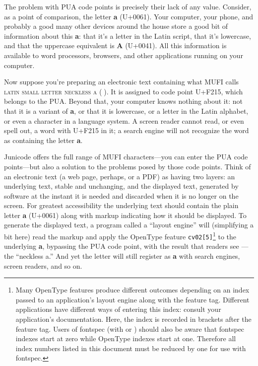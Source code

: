 \documentclass[12pt,letterpaper,openany]{book}
\newcommand\textLetterExample[1]{\textrm{\textbf{\color{BrickRed}#1}}}
\newcommand\textUName[1]{\textsc{#1}}
\newcommand\textSourceText[1]{{\color{GGOrange}\texttt{#1}}}
\newcommand{\cvd}[3][0]{{\addfontfeature{CharacterVariant=#2:#1}#3}}
\begin{document}
The problem with PUA code points is precisely their lack of any value. Consider, as a point of comparison, the letter
\textLetterExample{a} (U+0061). Your computer, your phone, and probably a good many other devices around the house
store a good bit of information about this \textLetterExample{a}: that it’s a letter in the Latin script, that
it’s lowercase, and that the uppercase equivalent is \textLetterExample{A} (U+0041). All this information is
available to word processors, browsers, and other applications running on your computer.

Now suppose you're preparing an electronic text containing what MUFI calls \textUName{latin small letter neckless
a} (\textLetterExample{}). It is assigned to code point U+F215, which belongs to the PUA. Beyond that, your
computer knows nothing about it: not that it is a variant of \textLetterExample{a}, or that it is lowercase, or a letter in the Latin
alphabet, or even a character in a language system. A screen reader cannot read, or even spell out, a word with U+F215
in it; a search engine will not recognize the word as containing the letter \textLetterExample{a}.

Junicode offers the full range of MUFI characters---you can enter the PUA code points---but also a solution to the
problems posed by those code points. Think of an electronic text (a web page, perhaps, or a PDF) as having two layers:
an underlying text, stable and unchanging, and the displayed text, generated by software at the instant it is needed
and discarded when it is no longer on the screen. For greatest accessibility the underlying text should contain the
plain letter \textLetterExample{a} (U+0061) along with markup indicating how it should be displayed. To generate
the displayed text, a program called a ``layout engine'' will (simplifying a bit here) read the markup and apply the
OpenType feature \textSourceText{cv02[5]}\footnote{Many OpenType features produce different outcomes depending on
an index passed to an application’s layout engine along with the feature tag. Different applications have different
ways of entering this index: consult your application’s documentation. Here, the index is recorded in brackets after
the feature tag. Users of fontspec (with {\XeLaTeX} or {\LuaTeX}) should also be aware that fontspec indexes start at zero
while OpenType indexes start at one. Therefore all index numbers listed in this document must be reduced by one for
use with fontspec.\par } to the underlying \textLetterExample{a}, bypassing the PUA code point, with the result that
readers see \textLetterExample{\cvd[4]{2}{a}}{}---the ``neckless a.'' And yet the letter will still register as
\textLetterExample{a} with search engines, screen readers, and so on.
\end{document}
